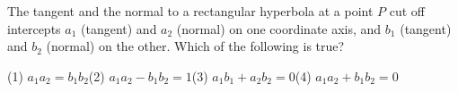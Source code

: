 The tangent and the normal to a rectangular hyperbola at a point $P$ cut off intercepts $a_1$ (tangent) and $a_2$ (normal) on one coordinate axis, and $b_1$ (tangent) and $b_2$ (normal) on the other. Which of the following is true?

(1) $a_1a_2=b_1b_2$\qquad (2) $a_1a_2-b_1b_2=1$\qquad (3) $a_1b_1+a_2b_2=0$\qquad (4) $a_1a_2+b_1b_2=0$
